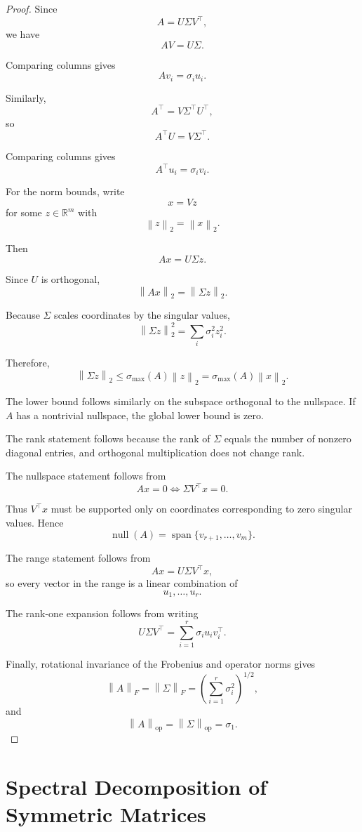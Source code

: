 \documentclass[12pt,oneside]{book}
\numberwithin{equation}{section}
\theoremstyle{definition}
\theoremstyle{plain}
\theoremstyle{remark}
\newcommand{\R}{\mathbb{R}}
\newcommand{\norm}[1]{\left\lVert #1 \right\rVert}
\begin{document}
\begin{proof}
Since
\[
A=U\Sigma V^\top,
\]
we have
\[
AV=U\Sigma.
\]

Comparing columns gives
\[
Av_i=\sigma_i u_i.
\]

Similarly,
\[
A^\top
=
V\Sigma^\top U^\top,
\]
so
\[
A^\top U=V\Sigma^\top.
\]

Comparing columns gives
\[
A^\top u_i=\sigma_i v_i.
\]

For the norm bounds, write
\[
x=Vz
\]
for some $z\in\R^m$ with
\[
\norm{z}_2=\norm{x}_2.
\]

Then
\[
Ax
=
U\Sigma z.
\]

Since $U$ is orthogonal,
\[
\norm{Ax}_2
=
\norm{\Sigma z}_2.
\]

Because $\Sigma$ scales coordinates by the singular values,
\[
\norm{\Sigma z}_2^2
=
\sum_i \sigma_i^2 z_i^2.
\]

Therefore,
\[
\norm{\Sigma z}_2
\leq
\sigma_{\max}(A)\norm{z}_2
=
\sigma_{\max}(A)\norm{x}_2.
\]

The lower bound follows similarly on the subspace orthogonal to the nullspace. If $A$ has a nontrivial nullspace, the global lower bound is zero.

The rank statement follows because the rank of $\Sigma$ equals the number of nonzero diagonal entries, and orthogonal multiplication does not change rank.

The nullspace statement follows from
\[
Ax=0
\iff
\Sigma V^\top x=0.
\]

Thus $V^\top x$ must be supported only on coordinates corresponding to zero singular values. Hence
\[
\operatorname{null}(A)
=
\operatorname{span}\{v_{r+1},\dots,v_m\}.
\]

The range statement follows from
\[
Ax=U\Sigma V^\top x,
\]
so every vector in the range is a linear combination of
\[
u_1,\dots,u_r.
\]

The rank-one expansion follows from writing
\[
U\Sigma V^\top
=
\sum_{i=1}^r
\sigma_i u_i v_i^\top.
\]

Finally, rotational invariance of the Frobenius and operator norms gives
\[
\norm{A}_F=\norm{\Sigma}_F
=
\left(
\sum_{i=1}^r\sigma_i^2
\right)^{1/2},
\]
and
\[
\norm{A}_{\mathrm{op}}
=
\norm{\Sigma}_{\mathrm{op}}
=
\sigma_1.
\]
\end{proof}

\section{Spectral Decomposition of Symmetric Matrices}
\end{document}
